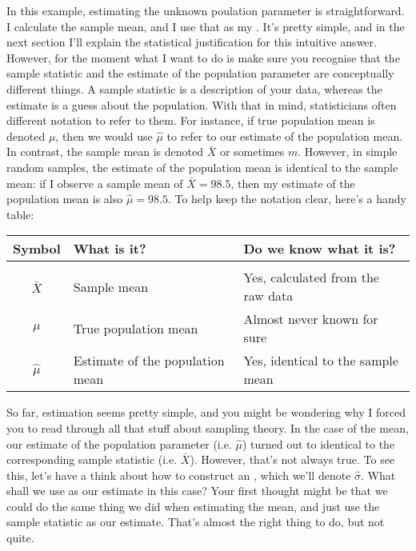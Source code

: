 In this example, estimating the unknown poulation parameter is straightforward. I calculate the sample mean, and I use that as my . It's pretty simple, and in the next section I'll explain the statistical justification for this intuitive answer. However, for the moment what I want to do is make sure you recognise that the sample statistic and the estimate of the population parameter are conceptually different things. A sample statistic is a description of your data, whereas the estimate is a guess about the population. With that in mind, statisticians often different notation to refer to them. For instance, if true population mean is denoted $\mu$, then we would use $\hat\mu$ to refer to our estimate of the population mean. In contrast, the sample mean is denoted $\bar{X}$ or sometimes $m$. However, in simple random samples, the estimate of the population mean is identical to the sample mean: if I observe a sample mean of $\bar{X} = 98.5$, then my estimate of the population mean is also $\hat\mu = 98.5$. To help keep the notation clear, here's a handy table:

\smallskip
\begin{center}
\small 
\begin{tabular}{cll}
Symbol & What is it? & Do we know what it is? \\ \hline \\[-6pt]
$\bar{X}$ & Sample mean & Yes, calculated from the raw data \\
$\mu$ & True population mean & Almost never known for sure \\
$\hat{\mu}$ & Estimate of the population mean & Yes, identical to the sample mean
\end{tabular}
\end{center}



So far, estimation seems pretty simple, and you might be wondering why I forced you to read through all that stuff about sampling theory. In the case of the mean, our estimate of the population parameter (i.e. $\hat\mu$) turned out to identical to the corresponding sample statistic (i.e. $\bar{X}$). However, that's not always true. To see this, let's have a think about how to construct an , which we'll denote  $\hat\sigma$. What shall we use as our estimate in this case? Your first thought might be that we could do the same thing we did when estimating the mean, and just use the sample statistic as our estimate. That's almost the right thing to do, but not quite. 

